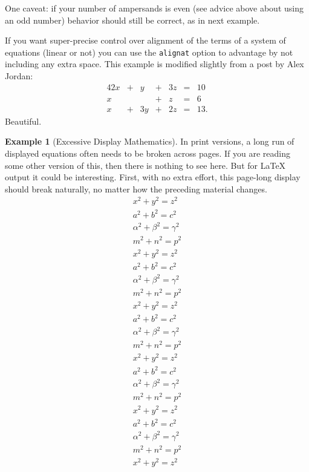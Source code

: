 \documentclass[10pt,]{article}
\theoremstyle{plain}
\theoremstyle{definition}
\theoremstyle{definition}
\theoremstyle{definition}
\theoremstyle{definition}
\newtheorem{example}[theorem]{Example}
\theoremstyle{definition}
\theoremstyle{definition}
\numberwithin{equation}{section}
\newcommand{\amp}{&}
\begin{document}
One caveat: if your number of ampersands is even (see advice above about using an odd number) behavior should still be correct, as in next example.%
\par
\hypertarget{p-185}{}%
If you want super-precise control over alignment of the terms of a system of equations (linear or not) you can use the \lstinline?alignat? option to advantage by not including any extra space.  This example is modified slightly from a post by Alex Jordan:%
\begin{alignat*}{4}
2x \amp {}+{} \amp  y \amp {}+{} \amp 3z \amp {}={} \amp 10\\
x  \amp       \amp    \amp {}+{} \amp  z \amp {}={} \amp 6\\
x  \amp {}+{} \amp 3y \amp {}+{} \amp 2z \amp {}={} \amp 13.
\end{alignat*}
Beautiful.%
\begin{example}[Excessive Display Mathematics]\label{example-3}
\hypertarget{p-186}{}%
In print versions, a long run of displayed equations often needs to be broken across pages.  If you are reading some other version of this, then there is nothing to see here.  But for \LaTeX{} output it could be interesting.  First, with no extra effort, this page-long display should break naturally, no matter how the preceding material changes.%
\begin{gather*}
x^2+y^2=z^2\\
a^2+b^2=c^2\\
\alpha^2+\beta^2=\gamma^2\\
m^2+n^2=p^2\\
x^2+y^2=z^2\\
a^2+b^2=c^2\\
\alpha^2+\beta^2=\gamma^2\\
m^2+n^2=p^2\\
x^2+y^2=z^2\\
a^2+b^2=c^2\\
\alpha^2+\beta^2=\gamma^2\\
m^2+n^2=p^2\\
x^2+y^2=z^2\\
a^2+b^2=c^2\\
\alpha^2+\beta^2=\gamma^2\\
m^2+n^2=p^2\\
x^2+y^2=z^2\\
a^2+b^2=c^2\\
\alpha^2+\beta^2=\gamma^2\\
m^2+n^2=p^2\\
x^2+y^2=z^2\\

\end{gather*}
\end{example}
\end{document}
